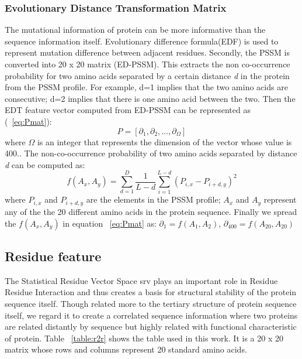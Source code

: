   \subsubsection{Evolutionary Distance Transformation Matrix}
  The mutational information of protein can be more informative than the sequence information itself\cite{Zhang2014}. Evolutionary difference formula(EDF) is used to represent mutation difference between adjacent residues. Secondly, the PSSM is converted into 20 x 20 matrix (ED-PSSM). This extracts the non co-occurrence probability for two amino acids separated by a certain distance \textit{d} in the protein from the PSSM profile. For example, d=1 implies that the two amino acids are consecutive; d=2 implies that there is one amino acid between the two. Then the EDT feature vector computed from ED-PSSM can be represented as (~\ref{eq:Pmat}): 
  \begin{equation}
    \label{eq:Pmat}
    P = [ \partial_1 ,\partial_2, \dots, \partial_\Omega]
  \end{equation}
  where $\Omega$ is an integer that represents the dimension of the vector whose value is 400.. The non-co-occurrence probability of two amino acids separated by distance \textit{d} can be computed as:
  \begin{equation}
    f(A_x,A_y) = \sum_{d=1}^{D} \frac{1}{L-d} \sum_{i=1}^{L-d} (P_{i,x} - P_{i+d,y})^2
    \label{eq:edt}
  \end{equation}
  where $P_{i,x}$ and $P_{i+d,y}$ are the elements in the PSSM profile; $A_x$ and $A_y$ represent any of the the 20 different amino acids in the protein sequence. Finally we spread the $f(A_x,A_y)$ in equation ~\ref{eq:Pmat} as:
  $ \partial_1 = f(A_1,A_2) $, 
  $ \partial_{400} = f(A_{20}, A_{20}) $
  
  
  \subsection{Residue feature} 
  The Statistical Residue Vector Space \acrshort{srv} \cite{Wong2018} plays an important role in Residue Residue Interaction and thus creates a basis for structural stability of the protein sequence itself. Though related more to the tertiary structure of protein sequence itself, we regard it to create a correlated sequence information where two proteins are related distantly by sequence but highly related with functional characteristic of protein. Table ~\ref{table:r2r} shows the table used in this work. It is a 20 x 20 matrix whose rows and columns represent 20 standard amino acids.
  
